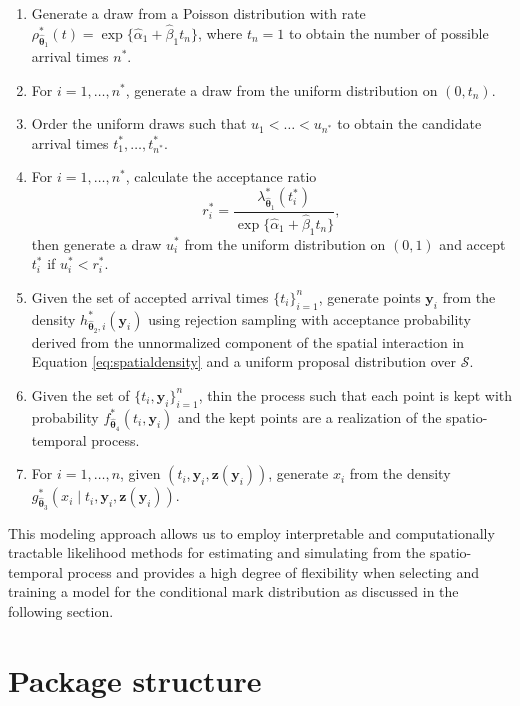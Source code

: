 \begin{enumerate}
\def\labelenumi{\arabic{enumi}.}
\tightlist
\item
  Generate a draw from a Poisson distribution with rate
  \(\rho_{\boldsymbol{\widehat{\theta}}_1}^*(t) = \exp \{\widehat{\alpha}_1 + \widehat{\beta}_1 t_n \}\),
  where \(t_n = 1\) to obtain the number of possible arrival times
  \(n^*\).
\item
  For \(i = 1, \dots, n^*\), generate a draw from the uniform
  distribution on \((0, t_n)\).
\item
  Order the uniform draws such that \(u_1 < \dots < u_{n^*}\) to obtain
  the candidate arrival times \(t_1^*,\dots, t_{n^*}^*\).
\item
  For \(i = 1, \dots, n^*\), calculate the acceptance ratio \[
    r_i^* = \frac{\lambda_{\boldsymbol{\widehat{\theta}}_1}^*(t_i^*)}{\exp \{\widehat{\alpha}_1 + \widehat{\beta}_1 t_n \}},
    \] then generate a draw \(u_i^*\) from the uniform distribution on
  \((0, 1)\) and accept \(t_i^*\) if \(u_i^* < r_i^*\).
\item
  Given the set of accepted arrival times \(\{t_i\}_{i=1}^n\), generate
  points \(\boldsymbol{y}_i\) from the density
  \(h_{\boldsymbol{\widehat{\theta}}_2, i}^*(\boldsymbol{y}_i)\) using
  rejection sampling with acceptance probability derived from the
  unnormalized component of the spatial interaction in Equation
  \eqref{eq:spatialdensity} and a uniform proposal distribution over
  \(\mathscr{S}\).
\item
  Given the set of \(\{t_i, \boldsymbol{y}_i\}_{i=1}^n\), thin the
  process such that each point is kept with probability
  \(f_{\boldsymbol{\widehat{\theta}}_4}^*(t_i, \boldsymbol{y}_i)\) and the
  kept points are a realization of the spatio-temporal process.
\item
  For \(i = 1, \dots, n\), given
  \((t_i, \boldsymbol{y}_i, \boldsymbol{z}(\boldsymbol{y}_i))\),
  generate \(x_i\) from the density
  \(g_{\boldsymbol{\widehat{\theta}}_3}^*(x_i \mid t_i, \boldsymbol{y}_i, \boldsymbol{z}(\boldsymbol{y}_i))\).
\end{enumerate}

This modeling approach allows us to employ interpretable and
computationally tractable likelihood methods for estimating and
simulating from the spatio-temporal process and provides a high degree
of flexibility when selecting and training a model for the conditional
mark distribution as discussed in the following section.

\section{Package structure}\label{sec:package}

